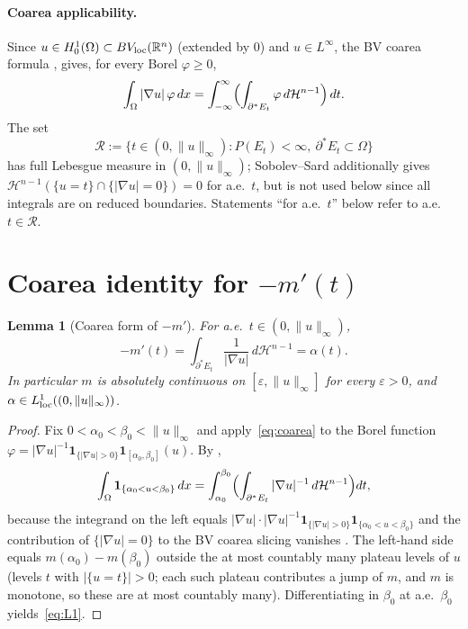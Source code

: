 \documentclass[11pt]{article}
\newtheorem{lemma}[theorem]{Lemma}
\theoremstyle{definition}
\newcommand{\R}{\mathbb{R}}
\newcommand{\Om}{\Omega}
\newcommand{\eps}{\varepsilon}
\begin{document}
\paragraph{Coarea applicability.} Since $u\in H^{1}_{0}(\Om)\subset
BV_{\rm loc}(\R^{n})$ (extended by $0$) and $u\in L^{\infty}$, the BV
coarea formula \cite[Thm.~13.1]{Maggi2012}, \cite[Thm.~3.40]{AFP2000}
gives, for every Borel $\varphi\ge 0$,
\begin{equation}\label{eq:coarea}
   \int_{\Om}|\nabla u|\,\varphi\,dx
   =\int_{-\infty}^{\infty}\Bigl(\int_{\partial^{*}E_{t}}\varphi\,d\mathcal
   H^{n-1}\Bigr)\,dt.
\end{equation}
The set
\[
   \mathcal R:=\bigl\{t\in(0,\|u\|_{\infty}):
   P(E_{t})<\infty,\ \partial^{*}E_{t}\subset\Om\bigr\}
\]
has full Lebesgue measure in $(0,\|u\|_{\infty})$; Sobolev--Sard
\cite[App.~A, Thm.~A.1]{FigalliMaggi2011} additionally gives
$\mathcal H^{n-1}(\{u=t\}\cap\{|\nabla u|=0\})=0$ for a.e.\ $t$, but is
not used below since all integrals are on reduced boundaries.
Statements ``for a.e.\ $t$'' below refer to a.e.\ $t\in\mathcal R$.

\section{Coarea identity for $-m'(t)$}\label{sec:coarea}

\begin{lemma}[Coarea form of $-m'$]\label{lem:coarea}
For a.e.\ $t\in(0,\|u\|_{\infty})$,
\begin{equation}\label{eq:L1}
   -m'(t)
   =\int_{\partial^{*}E_{t}}\frac{1}{|\nabla u|}\,d\mathcal H^{n-1}
   =\alpha(t).
\end{equation}
In particular $m$ is absolutely continuous on $[\eps,\|u\|_{\infty}]$ for
every $\eps>0$, and $\alpha\in L^{1}_{\rm loc}((0,\|u\|_{\infty}))$.
\end{lemma}

\begin{proof}
Fix $0<\alpha_{0}<\beta_{0}<\|u\|_{\infty}$ and apply~\eqref{eq:coarea}
to the Borel function $\varphi=|\nabla u|^{-1}
\mathbf 1_{\{|\nabla u|>0\}}\mathbf 1_{[\alpha_{0},\beta_{0}]}(u)$. By
\cite[Thm.~13.1]{Maggi2012},
\[
   \int_{\Om}\mathbf 1_{\{\alpha_{0}<u<\beta_{0}\}}\,dx
   =\int_{\alpha_{0}}^{\beta_{0}}
     \Bigl(\int_{\partial^{*}E_{t}}|\nabla u|^{-1}\,d\mathcal H^{n-1}
     \Bigr)dt,
\]
because the integrand on the left equals
$|\nabla u|\cdot|\nabla u|^{-1}\mathbf 1_{\{|\nabla u|>0\}}
\mathbf 1_{\{\alpha_{0}<u<\beta_{0}\}}$ and the contribution of
$\{|\nabla u|=0\}$ to the BV coarea slicing vanishes \cite[3.40(b)]{AFP2000}.
The left-hand side equals $m(\alpha_{0})-m(\beta_{0})$ outside the at
most countably many plateau levels of $u$ (levels $t$ with $|\{u=t\}|>0$;
each such plateau contributes a jump of $m$, and $m$ is monotone, so
these are at most countably many). Differentiating in $\beta_{0}$ at
a.e.\ $\beta_{0}$ yields~\eqref{eq:L1}.
\end{proof}
\end{document}
